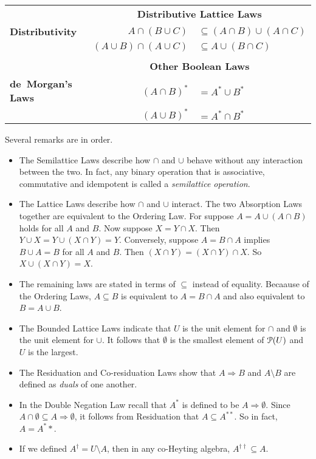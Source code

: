 \begin{laws}
\begin{tabular}{lr@{\,}l}
		&\multicolumn{2}{c}{\textbf{Distributive Lattice Laws}}\\						
		\textbf{Distributivity} & $A\cap(B\cup C)$ &$\subseteq (A\cap B)\cup (A\cap C)$\\
			                    & $(A\cup B)\cap (A\cup C)$ & $\subseteq A\cup(B\cap C)$\\
		&&\\
		&\multicolumn{2}{c}{\textbf{Other Boolean Laws}}\\
		\textbf{de~Morgan's Laws} & $(A\cap B)^*$ & $=A^* \cup B^*$\\
				&$(A\cup B)^*$ & $=A^*\cap B^*$				
	\end{tabular}
\end{laws}

Several remarks are in order.
\begin{itemize}
	\item The Semilattice Laws describe how $\cap$ and $\cup$ behave without any interaction between the two. 
	In fact, any binary operation that is associative, commutative and idempotent is called a \emph{semilattice operation}.
	\item The Lattice Laws describe how $\cap$ and $\cup$ interact.
	The two Absorption Laws together are equivalent to the Ordering Law.
	For suppose $A = A\cup(A\cap B)$ holds for all $A$ and $B$.
	Now suppose $X=Y\cap X$. 
	Then $Y\cup X = Y\cup (X\cap Y)=Y$. 
	Conversely, suppose $A=B\cap A$ implies $B\cup A = B$ for all $A$ and $B$. 
	Then $(X\cap Y) = (X\cap Y)\cap X$. 
	So $X \cup (X\cap Y) = X$.
	\item The remaining laws are stated in terms of $\subseteq$ instead of equality. 
	Becaause of the Ordering Laws, $A\subseteq B$ is equivalent to $A= B\cap A$ and also equivalent to $B = A\cup B$.
	\item The Bounded Lattice Laws indicate that $U$ is the unit element for $\cap$ and $\emptyset$ is the unit element for $\cup$.
	It follows that $\emptyset$ is the smallest element of ${\mathcal{P}}(U)$ and $U$ is the largest.
	\item The Residuation and Co-residuation Laws show that $A\Rightarrow B$ and $A\setminus B$ are defined as \emph{duals} of one another.
	\item In the Double Negation Law recall that $A^*$ is defined to be $A\Rightarrow\emptyset$. 
	Since $A\cap \emptyset \subseteq A\Rightarrow \emptyset$, it follows from Residuation that $A\subseteq A^{**}$. 
	So in fact, $A = A^**$. 
	\item If we defined $A^\dagger = U\setminus A$, then in any co-Heyting algebra, $A^{\dagger\dagger}\subseteq A$. 

\end{itemize}
